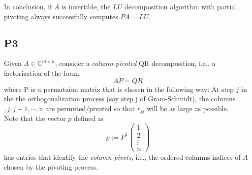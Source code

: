 \documentclass[11pt]{article}
\begin{document}
\noindent In conclusion, if $A$ is invertible, the $LU$ decomposition algorithm with partial pivoting always successfully computes $PA = LU$.


\subsection*{P3}
Given  $A\in \mathbb{C}^{m \times n}$, consider a \textit{column-pivoted} QR decomposition, i.e., a factorization of the form,
\begin{equation*}
 AP= QR
\end{equation*}
where P is a permutaion matrix that is chosen in the following way: At step $j$ in the the orthogonalization process (say step j of Gram-Schmidt), the columns $, j, j+1, \cdots, n$ are permuted/pivoted so that $r_{jj}$ will be as large as possible.\\
Note that the vector $p$ defined as
\begin{equation*}
p := P^T
\begin{pmatrix}
1\\
2\\
\vdots\\
n
\end{pmatrix}
\end{equation*}
has entries that identify the \textit{column pivots}, i.e., the ordered columns indices of $A$ chosen by the pivoting process.
\end{document}
